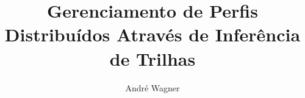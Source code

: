 \documentclass[a4paper]{article}
\author{André Wagner}
\title{Gerenciamento de Perfis Distribuídos Através de Inferência de Trilhas}
\begin{document}
\maketitle







\begin{small}
  
\end{small}
\end{document}
